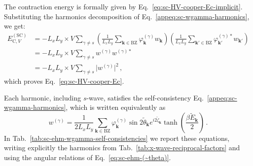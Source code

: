 \begin{tabproof}
	
	The contraction energy is formally given by Eq.~\eqref{eq:sc-HV-cooper-Ec-implicit}. Substituting the harmonics decomposition of Eq.~\eqref{appeq:sc-wgamma-harmonics}, we get:
	\[
	\begin{aligned}
		E_{\mathrm{C},V}^{(\mathrm{SC})} & = - L_x L_y \times V \sum_{\gamma\neq s} \left(\frac{1}{L_x L_y} \sum_{\mathbf{k}\in\mathrm{BZ}} \varphi_\mathbf{k}^{(\gamma)} w_\mathbf{k} \right) \left(\frac{1}{L_x L_y} \sum_{\mathbf{k}'\in\mathrm{BZ}} \varphi_{\mathbf{k}'}^{(\gamma)*} w_{\mathbf{k}'} \right) \\
		&= - L_x L_y \times V \sum_{\gamma\neq s}  w^{(\gamma)}  w^{(\gamma)*}  \\
		&= - L_x L_y \times V \sum_{\gamma\neq s} \big| w^{(\gamma)} \big|^2 \, ,
	\end{aligned}
	\]
	which proves Eq.~\eqref{eq:sc-HV-cooper-Ec}.
\end{tabproof}

Each harmonic, including $s$-wave, satisfies the self-consistency Eq.~\eqref{appeq:sc-wgamma-harmonics}, which is written equivalently as
\begin{equation}\label{eq:sc-ehm-wgamma-self-consistency}
	w^{(\gamma)} = \frac{1}{2L_x L_y} 	\sum_{\mathbf{k}\in\mathrm{BZ}} \varphi_\mathbf{k}^{(\gamma)} \sin 2 \tilde{\theta}_\mathbf{k} e^{i 2\tilde{\zeta}_\mathbf{k}} \tanh(\frac{\beta \tilde{E}_\mathbf{k}}{2}) \, .
\end{equation}
In Tab.~\ref{tab:sc-ehm-wgamma-self-consistencies}
we report these equations, writing explicitly the harmonics from Tab.~\ref{tab:x-wave-reciprocal-factors} and using the angular relations of Eq.~\eqref{eq:sc-ehm-(~theta)}.

